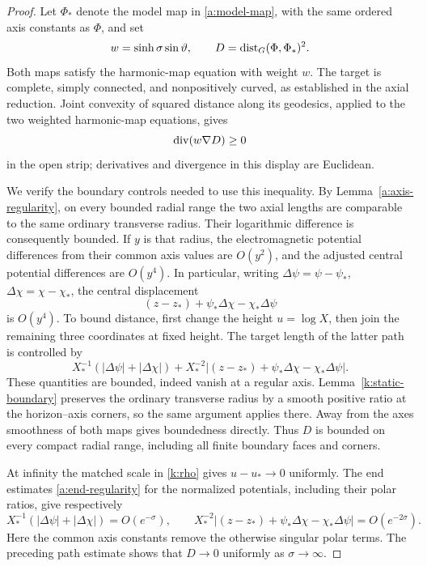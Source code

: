 \begin{proof}
Let \(\Phi_*\) denote the model map in \eqref{a:model-map}, with
the same ordered axis constants as \(\Phi\), and set
\[
 w=\sinh\sigma\sin\vartheta,\qquad
 D=\operatorname{dist}_G(\Phi,\Phi_*)^2.
\]
Both maps satisfy the harmonic-map equation with weight \(w\).
The target is complete, simply connected, and nonpositively
curved, as established in the axial reduction. Joint convexity of
squared distance along its geodesics, applied to the two weighted
harmonic-map equations, gives
\begin{equation}\label{k:distance}
 \operatorname{div}(w\nabla D)\ge0
\end{equation}
in the open strip; derivatives and divergence in this display are
Euclidean.

We verify the boundary controls needed to use this inequality.
By Lemma~\ref{a:axis-regularity}, on every bounded radial range
the two axial lengths are comparable
to the same ordinary transverse radius. Their logarithmic
difference is consequently bounded. If \(y\) is that radius, the
electromagnetic potential differences from their common axis
values are \(O(y^2)\), and the adjusted central potential
differences are \(O(y^4)\). In particular, writing
\(\Delta\psi=\psi-\psi_*\), \(\Delta\chi=\chi-\chi_*\), the central
displacement
\[
 (z-z_*)+\psi_*\Delta\chi-\chi_*\Delta\psi
\]
is \(O(y^4)\). To bound distance, first change the height
\(u=\log X\), then join the remaining three coordinates at fixed
height. The target length of the latter path is controlled by
\[
 X_*^{-1}(|\Delta\psi|+|\Delta\chi|)
 +X_*^{-2}|(z-z_*)+\psi_*\Delta\chi-\chi_*\Delta\psi|.
\]
These quantities are bounded, indeed vanish at a regular axis.
Lemma~\ref{k:static-boundary} preserves the ordinary transverse
radius by a smooth positive ratio at the horizon--axis corners,
so the same argument applies there. Away from the axes smoothness
of both maps gives boundedness directly. Thus \(D\) is bounded
on every compact radial range, including all finite boundary
faces and corners.

At infinity the matched scale in \eqref{k:rho} gives
\(u-u_*\to0\) uniformly. The end estimates \eqref{a:end-regularity} for the normalized
potentials, including their polar ratios, give respectively
\[
 X_*^{-1}(|\Delta\psi|+|\Delta\chi|)=O(e^{-\sigma}),
 \qquad
 X_*^{-2}|(z-z_*)+\psi_*\Delta\chi-\chi_*\Delta\psi|
                      =O(e^{-2\sigma}).
\]
Here the common axis constants remove the otherwise singular
polar terms. The preceding path estimate shows that \(D\to0\)
uniformly as \(\sigma\to\infty\).


\end{proof}
